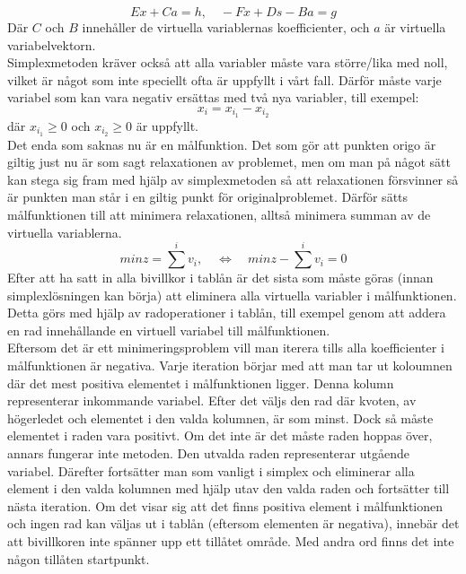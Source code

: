 $$Ex+Ca = h, \quad -Fx + Ds - Ba = g$$
Där $C$ och $B$ innehåller de virtuella variablernas koefficienter, och $a$ är virtuella variabelvektorn. \\ 
Simplexmetoden kräver också att alla variabler måste vara större/lika med noll, vilket är något som inte speciellt ofta är uppfyllt i vårt fall. Därför måste varje variabel som kan vara negativ ersättas med två nya variabler, till exempel:
$$x_i = x_{i_1} - x_{i_2}$$
där $x_{i_1}\geq 0$ och $x_{i_2}\geq 0$ är uppfyllt. \\
Det enda som saknas nu är en målfunktion. Det som gör att punkten origo är giltig just nu är som sagt relaxationen av problemet, men om man på något sätt kan stega sig fram med hjälp av simplexmetoden så att relaxationen försvinner så är punkten man står i en giltig punkt för originalproblemet. Därför sätts målfunktionen till att minimera relaxationen, alltså minimera summan av de virtuella variablerna.
$$min z = \sum^i {v_i}, \quad  \Leftrightarrow \quad min z - \sum^i {v_i} = 0$$
Efter att ha satt in alla bivillkor i tablån är det sista som måste göras (innan simplexlösningen kan börja) att eliminera alla virtuella variabler i målfunktionen. Detta görs med hjälp av radoperationer i tablån, till exempel genom att addera en rad innehållande en virtuell variabel till målfunktionen. \\
Eftersom det är ett minimeringsproblem vill man iterera tills alla koefficienter i målfunktionen är negativa. Varje iteration börjar med att man tar ut koloumnen där det mest positiva elementet i målfunktionen ligger. Denna kolumn representerar inkommande variabel. Efter det väljs den rad där kvoten, av högerledet och elementet i den valda kolumnen, är som minst. Dock så måste elementet i raden vara positivt. Om det inte är det måste raden hoppas över, annars fungerar inte metoden. Den utvalda raden representerar utgående variabel. Därefter fortsätter man som vanligt i simplex och eliminerar alla element i den valda kolumnen med hjälp utav den valda raden och fortsätter till nästa iteration. Om det visar sig att det finns positiva element i målfunktionen och ingen rad kan väljas ut i tablån (eftersom elementen är negativa), innebär det att bivillkoren inte spänner upp ett tillåtet område. Med andra ord finns det inte någon tillåten startpunkt.

